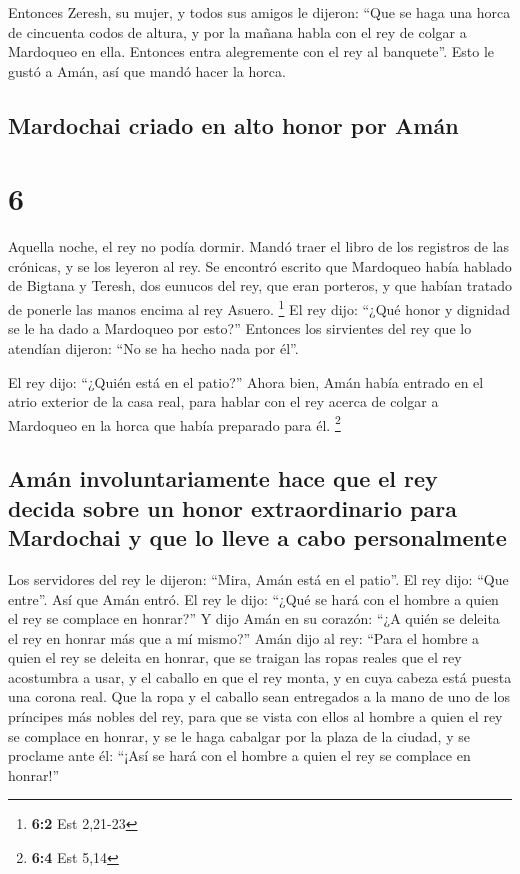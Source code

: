  Entonces Zeresh, su mujer, y todos sus amigos le
dijeron: ``Que se haga una horca de cincuenta codos de altura, y por la
mañana habla con el rey de colgar a Mardoqueo en ella. Entonces entra
alegremente con el rey al banquete''. Esto le gustó a Amán, así que
mandó hacer la horca.

\hypertarget{mardochai-criado-en-alto-honor-por-amuxe1n}{%
\subsection{Mardochai criado en alto honor por
Amán}\label{mardochai-criado-en-alto-honor-por-amuxe1n}}

\hypertarget{section-5}{%
\section{6}\label{section-5}}

 Aquella noche, el rey no podía dormir. Mandó traer el
libro de los registros de las crónicas, y se los leyeron al rey.
 Se encontró escrito que Mardoqueo había hablado de
Bigtana y Teresh, dos eunucos del rey, que eran porteros, y que habían
tratado de ponerle las manos encima al rey Asuero. \footnote{\textbf{6:2}
  Est 2,21-23}  El rey dijo: ``¿Qué honor y dignidad se le
ha dado a Mardoqueo por esto?'' Entonces los sirvientes del rey que lo
atendían dijeron: ``No se ha hecho nada por él''.

 El rey dijo: ``¿Quién está en el patio?'' Ahora bien,
Amán había entrado en el atrio exterior de la casa real, para hablar con
el rey acerca de colgar a Mardoqueo en la horca que había preparado para
él. \footnote{\textbf{6:4} Est 5,14}

\hypertarget{amuxe1n-involuntariamente-hace-que-el-rey-decida-sobre-un-honor-extraordinario-para-mardochai-y-que-lo-lleve-a-cabo-personalmente}{%
\subsection{Amán involuntariamente hace que el rey decida sobre un honor
extraordinario para Mardochai y que lo lleve a cabo
personalmente}\label{amuxe1n-involuntariamente-hace-que-el-rey-decida-sobre-un-honor-extraordinario-para-mardochai-y-que-lo-lleve-a-cabo-personalmente}}

 Los servidores del rey le dijeron: ``Mira, Amán está en
el patio''. El rey dijo: ``Que entre''.  Así que Amán
entró. El rey le dijo: ``¿Qué se hará con el hombre a quien el rey se
complace en honrar?'' Y dijo Amán en su corazón: ``¿A quién se deleita
el rey en honrar más que a mí mismo?''  Amán dijo al rey:
``Para el hombre a quien el rey se deleita en honrar,  que
se traigan las ropas reales que el rey acostumbra a usar, y el caballo
en que el rey monta, y en cuya cabeza está puesta una corona real.
 Que la ropa y el caballo sean entregados a la mano de uno
de los príncipes más nobles del rey, para que se vista con ellos al
hombre a quien el rey se complace en honrar, y se le haga cabalgar por
la plaza de la ciudad, y se proclame ante él: ``¡Así se hará con el
hombre a quien el rey se complace en honrar!''


